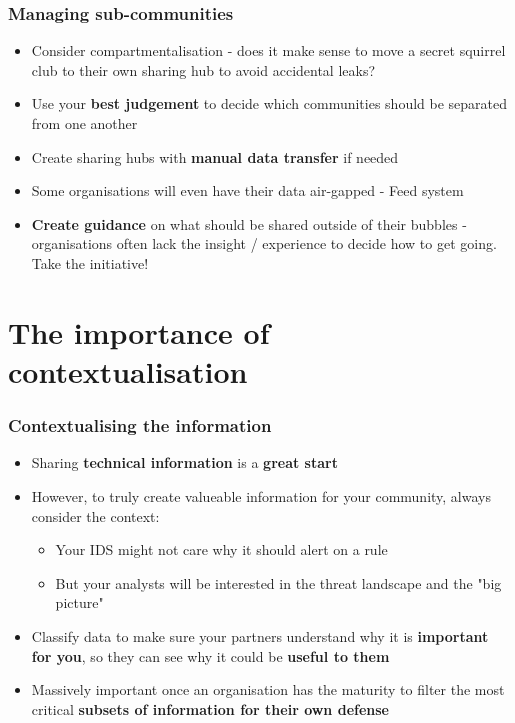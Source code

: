 \begin{frame}
	\frametitle{Managing sub-communities}
	\begin{itemize}
		\item Consider compartmentalisation - does it make sense to move a secret squirrel club to their own sharing hub to avoid accidental leaks?
		\item Use your \textbf{best judgement} to decide which communities should be separated from one another
		\item Create sharing hubs with \textbf{manual data transfer} if needed
		\item Some organisations will even have their data air-gapped - Feed system
		\item \textbf{Create guidance} on what should be shared outside of their bubbles - organisations often lack the insight / experience to decide how to get going. Take the initiative!
	\end{itemize}
\end{frame}

\section{The importance of \\ contextualisation}

\begin{frame}
	\frametitle{Contextualising the information}
	\begin{itemize}
		\item Sharing \textbf{technical information} is a \textbf{great start}
		\item However, to truly create valueable information for your community, always consider the context:
		\begin{itemize}
			\item Your IDS might not care why it should alert on a rule
			\item But your analysts will be interested in the threat landscape and the "big picture"
		\end{itemize}
		\item Classify data to make sure your partners understand why it is \textbf{important for you}, so they can see why it could be \textbf{useful to them}
		\item Massively important once an organisation has the maturity to filter the most critical \textbf{subsets of information for their own defense}
	\end{itemize}
\end{frame}

